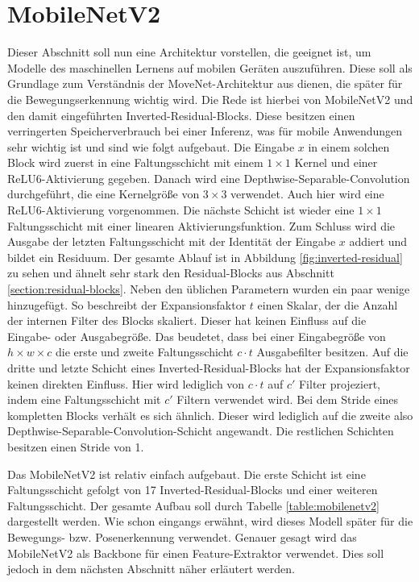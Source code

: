 \section{MobileNetV2}
Dieser Abschnitt soll nun eine Architektur vorstellen, die geeignet ist, um
Modelle des maschinellen Lernens auf mobilen Geräten auszuführen. Diese soll
als Grundlage zum Verständnis der MoveNet-Architektur aus \cite{movenet}
dienen, die später für die Bewegungserkennung wichtig wird. Die Rede ist
hierbei von MobileNetV2 \cite{sandler2019mobilenetv2} und den damit
eingeführten Inverted-Residual-Blocks. Diese besitzen einen verringerten
Speicherverbrauch bei einer Inferenz, was für mobile Anwendungen sehr wichtig
ist und sind wie folgt aufgebaut. Die Eingabe $x$ in einem solchen Block wird
zuerst in eine Faltungsschicht mit einem $1 \times 1$ Kernel und einer
ReLU6-Aktivierung gegeben. Danach wird eine Depthwise-Separable-Convolution
\cite{howard2017mobilenets} durchgeführt, die eine Kernelgröße von $3 \times 3$
verwendet. Auch hier wird eine ReLU6-Aktivierung vorgenommen. Die nächste
Schicht ist wieder eine $1 \times 1$ Faltungsschicht mit einer linearen
Aktivierungsfunktion. Zum Schluss wird die Ausgabe der letzten Faltungsschicht
mit der Identität der Eingabe $x$ addiert und bildet ein Residuum. Der gesamte
Ablauf ist in Abbildung \ref{fig:inverted-residual} zu sehen und ähnelt sehr
stark den Residual-Blocks aus Abschnitt \ref{section:residual-blocks}. Neben
den üblichen Parametern wurden ein paar wenige hinzugefügt. So beschreibt der
Expansionsfaktor $t$ einen Skalar, der die Anzahl der internen Filter des
Blocks skaliert. Dieser hat keinen Einfluss auf die Eingabe- oder Ausgabegröße.
Das beudetet, dass bei einer Eingabegröße von $h \times w \times c$ die erste
und zweite Faltungsschicht $c \cdot t$ Ausgabefilter besitzen. Auf die dritte
und letzte Schicht eines Inverted-Residual-Blocks hat der Expansionsfaktor
keinen direkten Einfluss. Hier wird lediglich von $c \cdot t$ auf $c'$ Filter
projeziert, indem eine Faltungsschicht mit $c'$ Filtern verwendet wird. Bei dem Stride eines kompletten Blocks verhält es sich ähnlich.
Dieser wird lediglich auf die zweite also
Depthwise-Separable-Convolution-Schicht angewandt. Die restlichen Schichten
besitzen einen Stride von 1.

Das MobileNetV2 ist relativ einfach aufgebaut. Die erste Schicht
ist eine Faltungsschicht gefolgt von 17 Inverted-Residual-Blocks
und einer weiteren Faltungsschicht. Der gesamte Aufbau soll
durch Tabelle \ref{table:mobilenetv2} dargestellt werden. Wie schon eingangs
erwähnt, wird dieses Modell später für die Bewegungs- bzw. Posenerkennung
verwendet. Genauer gesagt wird das MobileNetV2 als Backbone für einen
Feature-Extraktor verwendet. Dies soll jedoch in dem nächsten Abschnitt näher
erläutert werden.

